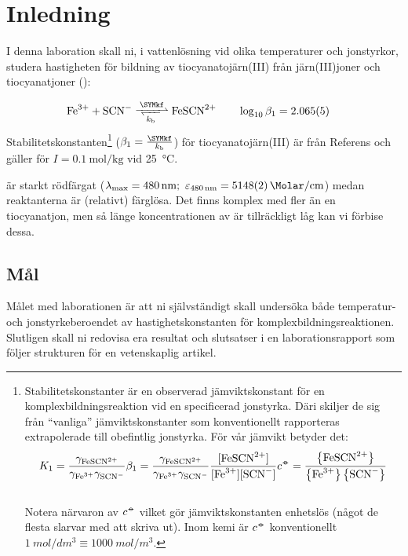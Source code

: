 \section{Inledning}
\label{sec:inledning}
I denna laboration skall ni, i vattenlösning vid olika temperaturer och
jonstyrkor, studera hastigheten för bildning av tiocyanatojärn(III) från
järn(III)joner och tiocyanatjoner ():

\begin{align}
  \label{eq:equilibrium}
  \ce{Fe^3+ + SCN- <=>>[\SYMkf][k_\mathrm{b}] FeSCN^2+} & \hspace{2em} %
    \log_{10} \beta_1 = \num{2.065(5)} %
\end{align}
Stabilitetskonstanten\footnote{Stabilitetskonstanter är en observerad
  jämviktskonstant för en komplexbildningsreaktion vid en specificerad
  jonstyrka. Däri skiljer de sig från ``vanliga'' jämviktskonstanter som
  konventionellt rapporteras extrapolerade till obefintlig jonstyrka. För
  vår jämvikt betyder det:\\
  \begin{align}
    K_1 =
    \frac{\gamma_{\ce{FeSCN^{2+}}}}{\gamma_{\ce{Fe^{3+}}}\gamma_{\ce{SCN^-}}}
    \beta_1 =
    \frac{\gamma_{\ce{FeSCN^{2+}}}}{\gamma_{\ce{Fe^{3+}}}\gamma_{\ce{SCN^-}}}
    \frac{[\ce{FeSCN^{2+}}]}{[\ce{Fe^{3+}}][\ce{SCN-}]} c^{\plimsoll} =
    \frac{\left\{\ce{FeSCN^{2+}}\right\}}{\left\{\ce{Fe^{3+}}\right\}\left\{\ce{SCN-}\right\}}
  \end{align}
\\Notera närvaron av $c^{{-\kern-5pt{\circ}\kern-5pt-}}$ vilket gör jämviktskonstanten
  enhetslös (något de flesta slarvar med att skriva ut). Inom kemi är
  $c^{-\kern-5pt{\circ}\kern-5pt-}$ konventionellt $\SI{1}{mol/dm^3} \equiv \SI{1000}{mol/m^3}$.
} ($\beta_1 = \frac{\SYMkf}{k_\mathrm{b}}$) för
tiocyanatojärn(III) är från
Referens\cite{peintler_improved_2000} och gäller för $I =
\SI{0.1}{\mole\per\kg}$ vid \SI{25}{\degreeCelsius}.

 är starkt rödfärgat ($\lambda_{\mathrm{max}}=\SI{480}{\nm};
~\varepsilon_{\SI{480}{\nm}} =
\SI{5148(2)}{\per\Molar\per\centi\metre}$)
\cite{peintler_improved_2000} medan reaktanterna är (relativt) färglösa. Det finns
komplex med fler än en tiocyanatjon, men så länge koncentrationen av
 är tillräckligt låg kan vi förbise dessa.

\subsection{Mål}
Målet med laborationen är att ni självständigt skall undersöka både
temperatur- och jonstyrkeberoendet av hastighetskonstanten för
komplexbildningsreaktionen. Slutligen skall ni redovisa era resultat och
slutsatser i en laborationsrapport som följer strukturen för en
vetenskaplig artikel.

